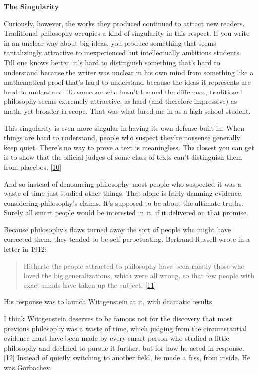 \textbf{The Singularity}

Curiously, however, the works they produced continued to attract new
readers. Traditional philosophy occupies a kind of singularity in this
respect. If you write in an unclear way about big ideas, you produce
something that seems tantalizingly attractive to inexperienced but
intellectually ambitious students. Till one knows better, it's hard to
distinguish something that's hard to understand because the writer was
unclear in his own mind from something like a mathematical proof that's
hard to understand because the ideas it represents are hard to
understand. To someone who hasn't learned the difference, traditional
philosophy seems extremely attractive: as hard (and therefore
impressive) as math, yet broader in scope. That was what lured me in as
a high school student.

This singularity is even more singular in having its own defense built
in. When things are hard to understand, people who suspect they're
nonsense generally keep quiet. There's no way to prove a text is
meaningless. The closest you can get is to show that the official judges
of some class of texts can't distinguish them from placebos.
{[}\hyperref[f10n]{10}{]}

And so instead of denouncing philosophy, most people who suspected it
was a waste of time just studied other things. That alone is fairly
damning evidence, considering philosophy's claims. It's supposed to be
about the ultimate truths. Surely all smart people would be interested
in it, if it delivered on that promise.

Because philosophy's flaws turned away the sort of people who might have
corrected them, they tended to be self-perpetuating. Bertrand Russell
wrote in a letter in 1912:

\begin{quote}
Hitherto the people attracted to philosophy have been mostly those who
loved the big generalizations, which were all wrong, so that few people
with exact minds have taken up the subject. {[}\hyperref[f11n]{11}{]}
\end{quote}

His response was to launch Wittgenstein at it, with dramatic results.

I think Wittgenstein deserves to be famous not for the discovery that
most previous philosophy was a waste of time, which judging from the
circumstantial evidence must have been made by every smart person who
studied a little philosophy and declined to pursue it further, but for
how he acted in response. {[}\hyperref[f12n]{12}{]} Instead of quietly
switching to another field, he made a fuss, from inside. He was
Gorbachev.

